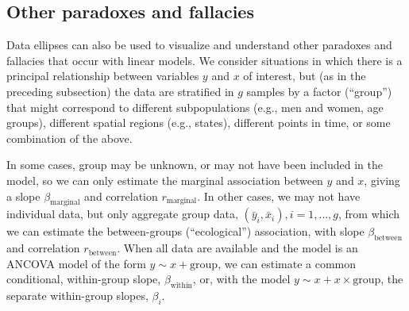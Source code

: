 \subsection{Other paradoxes and fallacies}

Data ellipses can also be used to visualize and understand other paradoxes and
fallacies that occur with linear models.  We consider situations in which there
is a principal relationship between variables $y$ and $x$ of interest, but (as in the preceding subsection) the data
are stratified in $g$  samples by a factor (``group'') that might correspond
to different subpopulations (e.g., men and women, age groups),
different spatial regions (e.g., states), different points in time, or some
combination of the above.

In some cases, group may be unknown, or may not have been included in the model,
so we can only estimate the marginal association between $y$ and $x$,
giving a slope $\beta_{\textrm{marginal}}$ and correlation $r_{\textrm{marginal}}$.
In other cases, we may not have individual data, but only aggregate group
data, $(\bar{y}_i, \bar{x}_i), i=1, \dots , g$, from which we can estimate
the between-groups (``ecological'') association, with slope
$\beta_{\textrm{between}}$ and correlation $r_{\textrm{between}}$.
When all data are available and the model is an ANCOVA model of the form
$y \sim x + \textrm{group}$,
we can estimate a common conditional, within-group slope,
$\beta_{\textrm{within}}$, or, with the model $y \sim x + x \times \textrm{group}$,
the separate within-group slopes, $\beta_i$.


